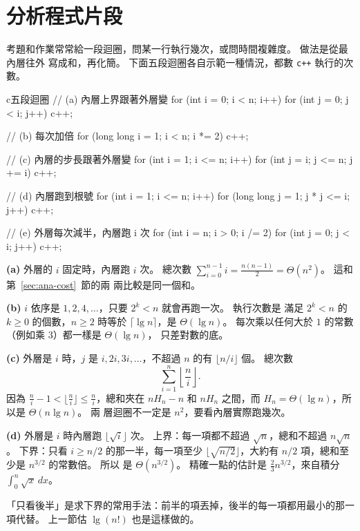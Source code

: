 \section{分析程式片段}
\label{sec:ana-fragments}

考題和作業常常給一段迴圈，問某一行執行幾次，或問時間複雜度。 做法是從最內層往外
寫成和，再化簡。 下面五段迴圈各自示範一種情況，都數 \texttt{c++} 執行的次數。

\begin{code}{c}{五段迴圈}
// (a) 內層上界跟著外層變
for (int i = 0; i < n; i++)
    for (int j = 0; j < i; j++)
        c++;

// (b) 每次加倍
for (long long i = 1; i < n; i *= 2)
    c++;

// (c) 內層的步長跟著外層變
for (int i = 1; i <= n; i++)
    for (int j = i; j <= n; j += i)
        c++;

// (d) 內層跑到根號
for (int i = 1; i <= n; i++)
    for (long long j = 1; j * j <= i; j++)
        c++;

// (e) 外層每次減半，內層跑 i 次
for (int i = n; i > 0; i /= 2)
    for (int j = 0; j < i; j++)
        c++;
\end{code}

\textbf{(a)} 外層的 $i$ 固定時，內層跑 $i$ 次。 總次數
$\sum_{i=0}^{n-1} i = \frac{n(n-1)}{2} = \Theta(n^2)$。 這和第~\ref{sec:ana-cost}~節的兩
兩比較是同一個和。

\textbf{(b)} $i$ 依序是 $1, 2, 4, \ldots$，只要 $2^k < n$ 就會再跑一次。 執行次數是
滿足 $2^k < n$ 的 $k \ge 0$ 的個數，$n \ge 2$ 時等於 $\lceil \lg n \rceil$，是
$\Theta(\lg n)$。 每次乘以任何大於 $1$ 的常數（例如乘 $3$）都一樣是 $\Theta(\lg n)$，
只差對數的底。

\textbf{(c)} 外層是 $i$ 時，$j$ 是 $i, 2i, 3i, \ldots$，不超過 $n$ 的有 $\lfloor n/i
\rfloor$ 個。 總次數
\[
\sum_{i=1}^{n} \left\lfloor \frac{n}{i} \right\rfloor.
\]
因為 $\frac{n}{i} - 1 < \lfloor \frac{n}{i} \rfloor \le \frac{n}{i}$，總和夾在
$n H_n - n$ 和 $n H_n$ 之間，而 $H_n = \Theta(\lg n)$，所以是 $\Theta(n \lg n)$。 兩
層迴圈不一定是 $n^2$，要看內層實際跑幾次。

\textbf{(d)} 外層是 $i$ 時內層跑 $\lfloor \sqrt{i} \rfloor$ 次。 上界：每一項都不超過
$\sqrt{n}$，總和不超過 $n\sqrt{n}$。 下界：只看 $i \ge n/2$ 的那一半，每一項至少
$\lfloor \sqrt{n/2} \rfloor$，大約有 $n/2$ 項，總和至少是 $n^{3/2}$ 的常數倍。 所以
是 $\Theta(n^{3/2})$。 精確一點的估計是 $\frac{2}{3} n^{3/2}$，來自積分
$\int_0^n \sqrt{x}\,dx$。

「只看後半」是求下界的常用手法：前半的項丟掉，後半的每一項都用最小的那一項代替。
上一節估 $\lg(n!)$ 也是這樣做的。

